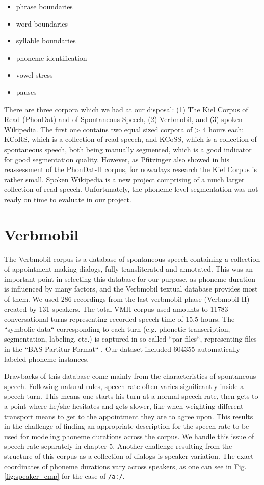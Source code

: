 \documentclass[a4paper]{scrreprt}
\begin{document}
\begin{itemize}
	\item phrase boundaries
	\item word boundaries
	\item syllable boundaries
	\item phoneme identification
	\item vowel stress
	\item pauses
\end{itemize}

There are three corpora which we had at our disposal: (1) The Kiel Corpus of Read (PhonDat) and of Spontaneous Speech, (2) Verbmobil, and (3) spoken Wikipedia. The first one contains two equal sized corpora of > 4 hours each: KCoRS, which is a collection of read speech, and KCoSS, which is a collection of spontaneous speech, both being manually segmented, which is a good indicator for good segmentation quality. However, as Pfitzinger \cite{Pfitzinger2002} also showed in his reassessment of the PhonDat-II corpus, for nowadays research the Kiel Corpus is rather small. Spoken Wikipedia is a new project comprising of a much larger collection of read speech. Unfortunately, the phoneme-level segmentation was not ready on time to evaluate in our project.

\section{Verbmobil}
The Verbmobil corpus is a database of spontaneous speech containing a collection of appointment making dialogs, fully transliterated and annotated. This was an important point in selecting this database for our purpose, as phoneme duration is influenced by many factors, and the Verbmobil textual database provides most of them. We used 286 recordings from the last verbmobil phase (Verbmobil II) created by 131 speakers. The total VMII corpus used amounts to 11783 conversational turns representing recorded speech time of 15,5 hours. The ``symbolic data`` corresponding to each turn (e.g. phonetic transcription, segmentation, labeling, etc.) is captured in so-called ``par files``, representing files in the ``BAS Partitur Format`` \cite{Burger2000}. Our dataset included 604355 automatically labeled phoneme instances.

Drawbacks of this database come mainly from the characteristics of spontaneous speech. Following natural rules, speech rate often varies significantly inside a speech turn. This means one starts his turn at a normal speech rate, then gets to a point where he/she hesitates and gets slower, like when weighting different transport means to get to the appointment they are to agree upon. This results in the challenge of finding an appropriate description for the speech rate to be used for modeling phoneme durations across the corpus. We handle this issue of speech rate separately in chapter 5. Another challenge resulting from the structure of this corpus as a collection of dialogs is speaker variation. The exact coordinates of phoneme durations vary across speakers, as one can see in Fig. \ref{fig:speaker_cmp} for the case of \texttt{/a:/}.
\end{document}
